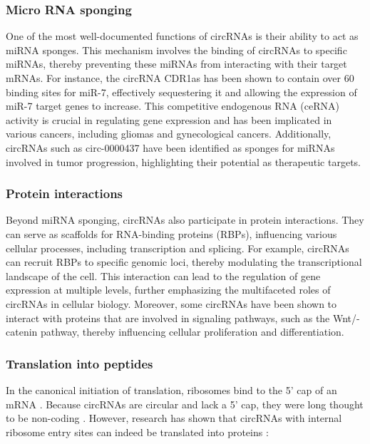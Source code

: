 \subsubsection{Micro RNA sponging}
One of the most well-documented functions of circRNAs is their ability to act
as miRNA sponges.
This mechanism involves the binding of circRNAs to specific miRNAs, thereby
preventing these miRNAs from interacting with their target mRNAs.
For instance, the circRNA CDR1as has been shown to contain over 60 binding
sites for miR-7, effectively sequestering it and allowing the expression of
miR-7 target genes to
increase\supercite{guo_expanded_2014,yuan_regulatory_2020}.
This competitive endogenous RNA (ceRNA) activity is crucial in regulating gene
expression and has been implicated in various cancers, including gliomas and
gynecological cancers\supercite{dong_expression_2020,song_circular_2016}.
Additionally, circRNAs such as circ-0000437 have been identified as sponges for
miRNAs involved in tumor progression, highlighting their potential as
therapeutic targets\supercite{li_peptide_2021,cui_circular_2022}.

\subsubsection{Protein interactions}
Beyond miRNA sponging, circRNAs also participate in protein interactions.
They can serve as scaffolds for RNA-binding proteins (RBPs), influencing
various cellular processes, including transcription and
splicing\supercite{li_comprehensive_2017,qu_emerging_2017}.
For example, circRNAs can recruit RBPs to specific genomic loci, thereby
modulating the transcriptional landscape of the
cell\supercite{li_comprehensive_2017}.
This interaction can lead to the regulation of gene expression at multiple
levels, further emphasizing the multifaceted roles of circRNAs in cellular
biology\supercite{zhang_important_2024,he_targeting_2021}.
Moreover, some circRNAs have been shown to interact with proteins that are
involved in signaling pathways, such as the Wnt/\textbeta{}-catenin pathway,
thereby influencing cellular proliferation and
differentiation\supercite{peng_novel_2021}.

\subsubsection{Translation into peptides}
In the canonical initiation of translation, ribosomes bind to the 5' cap of an
mRNA \supercite{hinnebusch_mechanism_2012}.
Because circRNAs are circular and lack a 5' cap, they were long thought to be
non-coding \supercite{bao_regulatory_2019,greene_circular_2017}.
However, research has shown that circRNAs with internal ribosome entry sites
can indeed be translated into proteins \supercite{chen_expanding_2020}:

